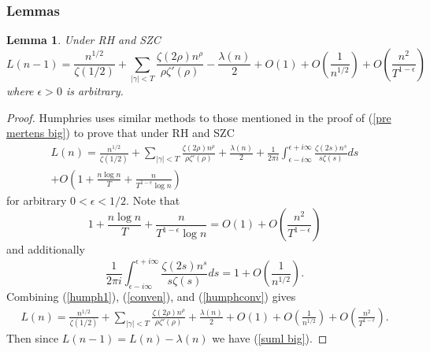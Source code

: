 \documentclass[11pt,article]{amsart}
\numberwithin{equation}{section}
\newtheorem{lemma}{Lemma}
\numberwithin{equation}{section}
\numberwithin{lemma}{section}
\numberwithin{prop}{section}
\begin{document}
\subsubsection{Lemmas}
\begin{lemma}
Under RH and SZC 
\begin{equation}
L(n-1)=\frac{n^{1/2}}{\zeta(1/2)}+\sum_{\left|\gamma\right|<T}\frac{\zeta(2\rho)n^{\rho}}{\rho\zeta'(\rho)}-\frac{\lambda(n)}{2}+O(1)+O\left(\frac{1}{n^{1/2}}\right)+O\left(\frac{n^{2}}{T^{1-\epsilon}}\right) \label{suml big}
\end{equation}
where $\epsilon>0$ is arbitrary. \label{humphlemma}
\end{lemma}
\begin{proof}
Humphries \cite{humphries} uses similar methods to those mentioned in the proof of (\ref{pre mertens big}) to prove that under RH and SZC
\begin{align}
L(n)=\frac{n^{1/2}}{\zeta(1/2)}+\sum_{\left|\gamma\right|<T}\frac{\zeta(2\rho)n^{\rho}}{\rho\zeta'(\rho)}+\frac{\lambda(n)}{2}+\frac{1}{2\pi i}\int_{\epsilon-i\infty}^{\epsilon+i\infty}\frac{\zeta(2s)n^{s}}{s\zeta(s)}ds \nonumber \\ +O\left(1+\frac{n\log n}{T}+\frac{n}{T^{1-\epsilon}\log n}\right) \label{humph1}
\end{align}
for arbitrary $0<\epsilon<1/2$. Note that 
\begin{equation}
1+\frac{n\log n}{T}+\frac{n}{T^{1-\epsilon}\log n}=O(1)+O\left(\frac{n^{2}}{T^{1-\epsilon}}\right) \label{conven}
\end{equation}
and additionally \cite{fawaz} \cite{humphries}
\begin{equation}
\frac{1}{2\pi i}\int_{\epsilon-i\infty}^{\epsilon+i\infty}\frac{\zeta(2s)n^{s}}{s\zeta(s)}ds=1+O\left(\frac{1}{n^{1/2}}\right). \label{humphconv}
\end{equation}
Combining (\ref{humph1}), (\ref{conven}), and (\ref{humphconv}) gives 
\begin{align}
L(n)=\frac{n^{1/2}}{\zeta(1/2)}+\sum_{\left|\gamma\right|<T}\frac{\zeta(2\rho)n^{\rho}}{\rho\zeta'(\rho)}+\frac{\lambda(n)}{2}+O(1)+O\left(\frac{1}{n^{1/2}}\right)+O\left(\frac{n^{2}}{T^{1-\epsilon}}\right). \label{pre suml big}
\end{align}
Then since $L(n-1)=L(n)-\lambda(n)$ we have (\ref{suml big}).
\end{proof}
\end{document}
